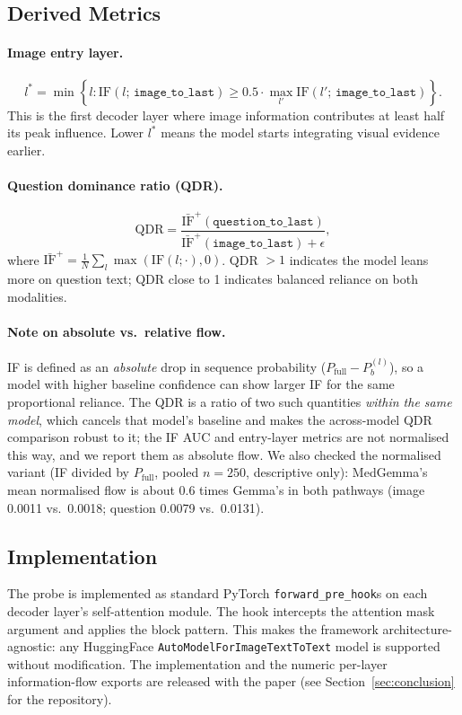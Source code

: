 \subsection{Derived Metrics}

\paragraph{Image entry layer.}
\[
  l^* = \min\left\{l : \text{IF}(l;\,\texttt{image\_to\_last}) \geq 0.5\cdot
  \max_{l'} \text{IF}(l';\,\texttt{image\_to\_last})\right\}.
\]
This is the first decoder layer where image information contributes at least half its
peak influence. Lower $l^*$ means the model starts integrating visual evidence earlier.

\paragraph{Question dominance ratio (QDR).}
\[
  \text{QDR} = \frac{\bar{\text{IF}}^+(\texttt{question\_to\_last})}
                    {\bar{\text{IF}}^+(\texttt{image\_to\_last}) + \epsilon},
\]
where $\bar{\text{IF}}^+ = \frac{1}{N}\sum_l \max(\text{IF}(l;\cdot), 0)$.
QDR $> 1$ indicates the model leans more on question text; QDR close to 1 indicates
balanced reliance on both modalities.

\paragraph{Note on absolute vs.\ relative flow.} IF is defined as an \emph{absolute}
drop in sequence probability ($P_\text{full} - P_b^{(l)}$), so a model with higher
baseline confidence can show larger IF for the same proportional reliance. The QDR is a
ratio of two such quantities \emph{within the same model}, which cancels that model's
baseline and makes the across-model QDR comparison robust to it; the IF AUC and
entry-layer metrics are not normalised this way, and we report them as absolute flow.
We also checked the normalised variant (IF divided by $P_\text{full}$, pooled $n{=}250$, descriptive only):
MedGemma's mean normalised flow is about 0.6 times Gemma's in both pathways (image
0.0011 vs.\ 0.0018; question 0.0079 vs.\ 0.0131).

\subsection{Implementation}

The probe is implemented as standard PyTorch \texttt{forward\_pre\_hook}s on each
decoder layer's self-attention module. The hook intercepts the attention mask argument
and applies the block pattern. This makes the framework architecture-agnostic: any
HuggingFace \texttt{AutoModelForImageTextToText} model is supported without
modification. The implementation and the numeric per-layer information-flow exports are
released with the paper (see Section~\ref{sec:conclusion} for the repository).
